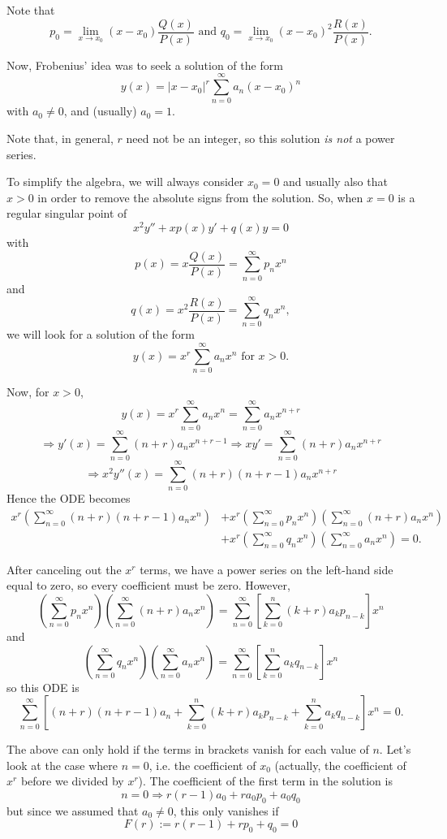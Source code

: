 \documentclass[11pt]{article}
\newcommand{\sumseries}{\sum_{n=0}^{\infty}}
\newcommand{\powerser}{(x - x_0)^n}
\begin{document}
	Note that
		$$ p_0 = \lim_{x \to x_0} (x-x_0) \frac{Q(x)}{P(x)} \text{ and } q_0 = \lim_{x \to x_0} (x-x_0)^2 \frac{R(x)}{P(x)} . $$

	Now, Frobenius' idea was to seek a solution of the form
		$$ y(x) = |x-x_0|^r \sumseries a_n \powerser $$
	with $a_0 \neq 0$, and (usually) $a_0 = 1$.

	Note that, in general, $r$ need not be an integer, so this solution \emph{is not} a power series.

	To simplify the algebra, we will always consider $x_0 = 0$ and usually also that $x > 0$ in order to remove the absolute signs from the solution. So, when $x=0$ is a regular singular point of
		$$ x^2 y'' + x p(x) y' + q(x) y = 0 $$
	with
		$$ p(x) = x \frac{Q(x)}{P(x)} = \sumseries p_n x^n $$
	and
		$$ q(x) = x^2 \frac{R(x)}{P(x)} = \sumseries q_n x^n , $$
	we will look for a solution of the form
		$$ y(x) = x^r \sumseries a_n x^n \text{ for } x > 0. $$

	Now, for $x>0$,
		$$ y(x) = x^r \sumseries a_n x^n = \sumseries a_n x^{n+r} $$
		$$ \Rightarrow y'(x) = \sumseries (n+r) a_n x^{n + r - 1} \Rightarrow xy' = \sumseries (n+r)a_n x^{n+r} $$
		$$ \Rightarrow x^2 y''(x) = \sumseries (n+r)(n+r-1) a_n x^{n+r} $$
	Hence the ODE becomes
		\begin{align*}
			x^r \left(\sumseries (n+r)(n+r-1) a_n x^{n}\right) &+ x^r \left(\sumseries p_n x^n\right) \left(\sumseries (n+r)a_n x^{n}\right) \\
				&+ x^r \left(\sumseries q_n x^n \right) \left(\sumseries a_n x^n \right) = 0.
		\end{align*}

	After canceling out the $x^r$ terms, we have a power series on the left-hand side equal to zero, so every coefficient must be zero. However,
		$$ \left(\sumseries p_n x^n\right) \left(\sumseries (n+r)a_n x^{n}\right) = \sumseries \left[\sum_{k=0}^n (k+r) a_k p_{n-k} \right] x^n $$
	and
		$$ \left(\sumseries q_n x^n \right) \left(\sumseries a_n x^n \right) = \sumseries \left[\sum_{k=0}^n a_k q_{n-k}\right] x^n $$
	so this ODE is
		$$ \sumseries \left[(n+r)(n+r-1)a_n + \sum_{k=0}^n (k+r) a_k p_{n-k} + \sum_{k=0}^n a_k q_{n-k}\right] x^n = 0. $$

	The above can only hold if the terms in brackets vanish for each value of $n$. Let's look at the case where $n=0$, i.e. the coefficient of $x_0$ (actually, the coefficient of $x^r$ before we divided by $x^r$). The coefficient of the first term in the solution is
		$$ n=0 \Rightarrow r (r-1) a_0 + r a_0 p_0 + a_0 q_0 $$
	but since we assumed that $a_0 \neq 0$, this only vanishes if
		$$ \boxed{F(r) := r (r-1) + r p_0 + q_0 = 0} $$
\end{document}
